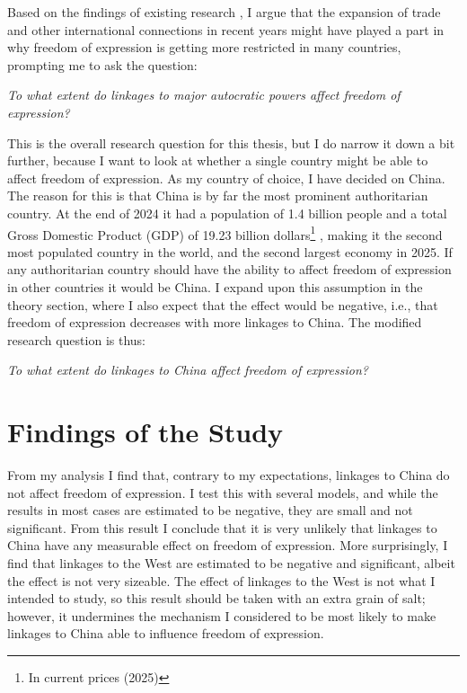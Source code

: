 Based on the findings of existing research \citep{ambrosio_constructing_2010, gamso_is_2021, levitsky_linkage_2006, luhrmann_third_2019}, I argue that the expansion of trade and other international connections in recent years might have played a part in why freedom of expression is getting more restricted in many countries, prompting me to ask the question:
\begin{displayquote}
    \textit{To what extent do linkages to major autocratic powers affect freedom of expression?}
    \label{rq:general}
\end{displayquote}
This is the overall research question for this thesis, but I do narrow it down a bit further, because I want to look at whether a single country might be able to affect freedom of expression. As my country of choice, I have decided on China. The reason for this is that China is by far the most prominent authoritarian country. At the end of 2024 it had a population of 1.4 billion people \citep{guojia_tongjiju_national_bureau_of_statistics_zong_2024} and a total Gross Domestic Product (GDP) of 19.23 billion dollars\footnote{In current prices (2025)} \citep{imf_world_2025}, making it the second most populated country in the world, and the second largest economy in 2025. If any authoritarian country should have the ability to affect freedom of expression in other countries it would be China. I expand upon this assumption in the theory section, where I also expect that the effect would be negative, i.e., that freedom of expression decreases with more linkages to China. The modified research question is thus:
\begin{displayquote}
    \textit{To what extent do linkages to China affect freedom of expression?}
    \label{rq:specific}
\end{displayquote}

\section{Findings of the Study}
From my analysis I find that, contrary to my expectations, linkages to China do not affect freedom of expression. I test this with several models, and while the results in most cases are estimated to be negative, they are small and not significant. From this result I conclude that it is very unlikely that linkages to China have any measurable effect on freedom of expression. More surprisingly, I find that linkages to the West are estimated to be negative and significant, albeit the effect is not very sizeable. The effect of linkages to the West is not what I intended to study, so this result should be taken with an extra grain of salt; however, it undermines the mechanism I considered to be most likely to make linkages to China able to influence freedom of expression.

